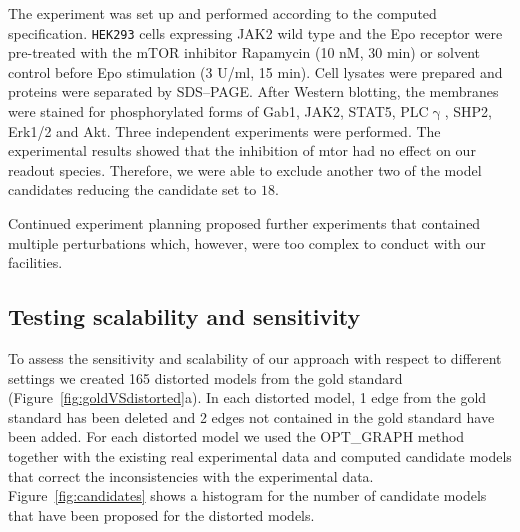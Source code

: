 The experiment was set up and performed according to the computed specification.
\texttt{HEK293} cells expressing JAK2 wild type and the Epo receptor were pre-treated
with the mTOR inhibitor Rapamycin (10 nM, 30 min) or solvent control before Epo
stimulation (3 U/ml, 15 min).
Cell lysates were prepared and proteins were separated by SDS–PAGE.
After Western blotting, the membranes were stained for phosphorylated forms of
Gab1, JAK2, STAT5, PLC$\upgamma$, SHP2, Erk1/2 and Akt.
Three independent experiments were performed.
The experimental results showed that the inhibition of {\sffamily mtor} had
no effect on our readout species.
Therefore, we were able to exclude another two of the model candidates reducing
the candidate set to $18$.

Continued experiment planning proposed further experiments that contained
multiple perturbations which, however, were too complex to conduct with our
facilities.


\subsection{Testing scalability and sensitivity }

To assess the sensitivity and scalability of our approach with respect to different settings
we created 165 distorted models from the gold standard (Figure~\ref{fig:goldVSdistorted}a).
In each distorted model, 1 edge from the gold standard has been deleted and 2 edges not contained
in the gold standard have been added.
For each distorted model we used the OPT\_GRAPH method together with the existing real experimental data
and computed candidate models that correct the inconsistencies with the experimental data.
Figure~\ref{fig:candidates} shows a histogram for the number of candidate models that have been proposed
for the distorted models.

